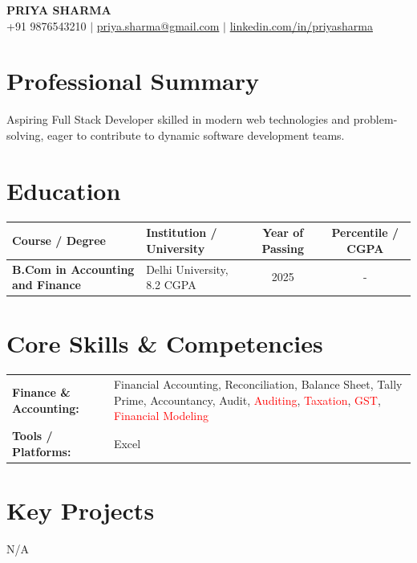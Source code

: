 \documentclass[10pt,a4paper]{article}
\begin{document}
\begin{center}
{\LARGE \textsc{\textbf{PRIYA SHARMA}}} \\ \vspace{3pt}
+91 9876543210 \quad $|$ \quad \href{mailto:priya.sharma@gmail.com}{priya.sharma@gmail.com} \quad $|$ \quad \href{https://linkedin.com/in/priyasharma}{linkedin.com/in/priyasharma}
\end{center}

\section*{Professional Summary}
Aspiring Full Stack Developer skilled in modern web technologies and problem-solving, eager to contribute to dynamic software development teams.

\section*{Education}
{\small
\renewcommand{\arraystretch}{1.18}
\noindent\begin{tabularx}{\textwidth}{|p{1.7in}|X|c|c|}
\hline
\textbf{Course / Degree} & \textbf{Institution / University} & \textbf{Year of Passing} & \textbf{Percentile / CGPA} \\ \hline
\textbf{B.Com in Accounting and Finance} & Delhi University, 8.2 CGPA & 2025 & - \\ \hline
\end{tabularx}
}\vspace{4pt}


\section*{Core Skills \& Competencies}
\begin{tabular}{@{}p{2.3in}p{4.5in}@{}}
\textbf{Finance \& Accounting:} & Financial Accounting, Reconciliation, Balance Sheet, Tally Prime, Accountancy, Audit, \textcolor{red}{Auditing}, \textcolor{red}{Taxation}, \textcolor{red}{GST}, \textcolor{red}{Financial Modeling} \\
\textbf{Tools / Platforms:} & Excel \\
\end{tabular}



\section*{Key Projects}
N/A


\end{document}
